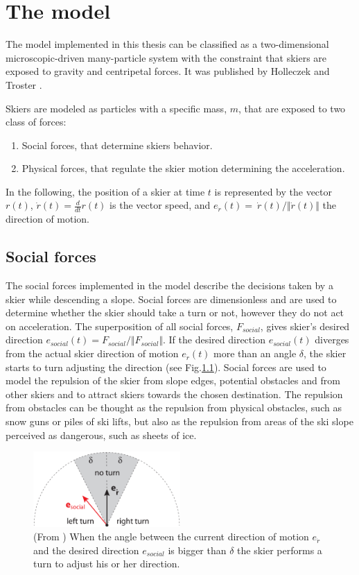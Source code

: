 \documentclass[12pt,a4paper,twoside]{book}
\begin{document}
\chapter{The model}\label{model}
The model implemented in this thesis can be classified as a two-dimensional microscopic-driven many-particle system with the constraint that skiers are exposed to gravity and centripetal forces. It was published by Holleczek and Troster \cite{hol2012}.

Skiers are modeled as particles with a specific mass, $m$, that are exposed to two class of forces:\begin{enumerate}
\item Social forces, that determine skiers behavior.
\item Physical forces, that regulate the skier motion determining the acceleration.
\end{enumerate}
In the following, the position of a skier at time $t$ is represented by the vector $r(t)$, $\dot{r}(t)=\frac{d}{dt}r(t)$ is the vector speed, and $e_{\dot{r}}(t)=\ \dot{r}(t) / \Vert \dot{r}(t)\Vert$ the direction of motion.

\section{Social forces}
The social forces implemented in the model describe the decisions taken by a skier while descending a slope. Social forces are dimensionless and are used to determine whether the skier should take a turn or not, however they do not act on acceleration. The superposition of all social forces, $F_{social}$, gives skier's desired direction $e_{social}(t)=F_{social} / \Vert F_{social} \Vert$. If the desired direction $e_{social}(t)$ diverges from the actual skier direction of motion $e_{\dot{r}}(t)$ more than an angle ${\delta}$, the skier starts to turn adjusting the direction (see Fig.\ref{start_turn_pic}). Social forces are used to model the repulsion of the skier from slope edges, potential obstacles and from other skiers and to attract skiers towards the chosen destination. The repulsion from obstacles can be thought as the repulsion from physical obstacles, such as snow guns or piles of ski lifts, but also as the repulsion from areas of the ski slope perceived as dangerous, such as sheets of ice.

\begin{figure}
  \begin{center}
    \includegraphics[width=0.5\textwidth]{images/start_turn_pic.eps}
    \caption{(From \cite{hol2012}) When the angle between the current direction of motion $e_{\dot{r}}$ and the desired direction $e_{social}$ is bigger than $\delta$ the skier performs a turn to adjust his or her direction.}\label{start_turn_pic}
  \end{center}
\end{figure}
\end{document}
